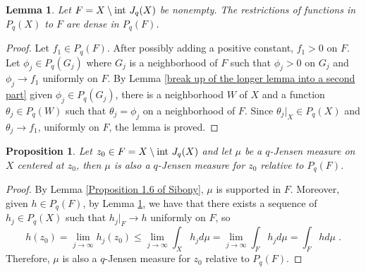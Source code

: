 \documentclass[12pt]{amsart}
\newtheorem{lem}[theorem]{Lemma}
\newtheorem{pro}[theorem]{Proposition}
\numberwithin{equation}{section}
{\theoremstyle{definition}
\newtheorem{remark}[theorem]{Remark}
}
\begin{document}
\begin{lem}\cite[Lemme 1.8]{St10}\label{Lemme 1.8 of Sibony}
Let $F = X \setminus \hbox{int }J_q(X)$ be nonempty.  The restrictions of functions in $P_q(X)$ to $F$ are dense in $P_q(F)$.  
\end{lem}

\begin{proof}
    Let $f_1 \in P_q(F)$.  After possibly adding a positive constant, $f_1 > 0$ on $F$. Let $\phi_j \in P_q(G_j)$ where $G_j$ is a neighborhood of $F$ such that $\phi_j > 0$ on $G_j$ and $\phi_j \to f_1$ uniformly on $F$.  By Lemma \ref{break up of the longer lemma into a second part} given $\phi_j \in P_q(G_j)$, there is a neighborhood $W$ of $X$ and a function $\theta_j \in P_q(W)$ such that $\theta_j = \phi_j$ on a neighborhood of $F$.  Since $\theta_j|_X \in P_q(X)$ and $\theta_j \to f_1$, uniformly on $F$, the lemma is proved.  

  

    
   
    
\end{proof}

\begin{pro}\cite[Corollaire 1.7]{Si87}\label{pro:J(F) trivial}
Let $z_0\in F = X \setminus \hbox{int }J_q(X)$ and let $\mu$ be a $q$-Jensen measure on $X$ centered at $z_0$, then $\mu$ is also a $q$-Jensen measure for $z_0$ relative to $P_q(F)$.
\end{pro}
\begin{proof}
By Lemma \ref{Proposition 1.6 of Sibony}, $\mu$ is supported in $F$. Moreover, given $h\in P_q(F)$, by Lemma \ref{Lemme 1.8 of Sibony}, we have that there exists a sequence of $h_j\in P_q(X)$ such that $h_j\vert_F\to h$ uniformly on $F$, so
$$h(z_0)=\lim_{j \to \infty} h_j(z_0)\leq \lim_{j \to \infty}\int_{X}h_jd\mu=\lim_{j \to \infty} \int_{F}h_jd\mu=\int_F hd\mu\;.$$
Therefore, $\mu$ is also a $q$-Jensen measure for $z_0$ relative to $P_q(F)$.
%
%
\end{proof}
\end{document}
